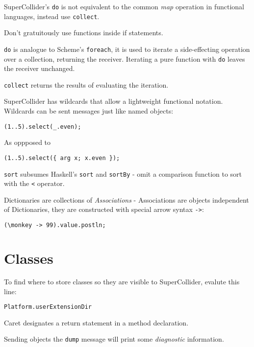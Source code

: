 \documentclass{article}
\begin{document}
SuperCollider's \texttt{do} is not equivalent to the common 
\emph{map} operation in functional languages, instead use 
\texttt{collect}.


Don't gratuitously use functions inside if statements.


\texttt{do} is analogue to Scheme's \texttt{foreach}, it is used 
to iterate a side-effecting operation over a collection, returning
the receiver. Iterating a pure function with \texttt{do} leaves 
the receiver unchanged. 

\texttt{collect} returns the results of evaluating the iteration.

SuperCollider has wildcards that allow a lightweight functional 
notation. Wildcards can be sent messages just like named objects:

\begin{verbatim}
(1..5).select(_.even);
\end{verbatim}

As oppposed to
\begin{verbatim}
(1..5).select({ arg x; x.even });
\end{verbatim}


\texttt{sort} subsumes Haskell's \texttt{sort} and 
\texttt{sortBy} - omit a comparison function to sort with the 
\texttt{<} operator.

Dictionaries are collections of \emph{Associations} - Associations 
are objects independent of Dictionaries, they are constructed with
special arrow syntax \texttt{->}:

\begin{verbatim}
(\monkey -> 99).value.postln;
\end{verbatim}


\section{Classes}

To find where to store classes so they are visible to 
SuperCollider, evalute this line:

\begin{verbatim}
Platform.userExtensionDir
\end{verbatim}

Caret designates a return statement in a method declaration.

Sending objects the \texttt{dump} message will print some 
\emph{diagnostic} information.

\end{document}
